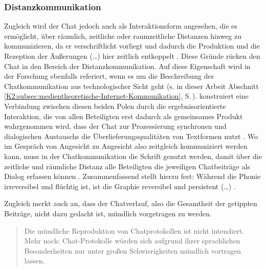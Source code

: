 \subsubsection{Distanzkommunikation}\label{K2:para:Distanzkommunikation}
Zugleich wird der Chat jedoch auch als Interaktionsform angesehen, die es ermöglicht, \glqq über räumlich, zeitliche oder raumzeitliche Distanzen hinweg\grqq{} \citep[12]{beck_computervermittelte_2006} zu kommunizieren, da er verschriftlicht vorliegt und dadurch \glqq die Produktion und die Rezeption der Äußerungen (\dots) hier zeitlich entkoppelt\grqq{} \citep[][35]{durscheid_personale_2018}. Diese Gründe rücken den Chat in den Bereich der Distanzkommunikation. Auf diese Eigenschaft wird in der Forschung ebenfalls referiert, wenn es um die Beschreibung der Chatkommunikation aus technologischer Sicht geht (s. in dieser Arbeit Abschnitt \ref{K2:subsec:medientheoretische-Internet-Kommunikation}, S.\,\pageref{K2:subsec:medientheoretische-Internet-Kommunikation}). \citeauthor{beiswenger_chattern_2010} konstruiert eine Verbindung zwischen diesen beiden Polen durch die ergebnisorientierte Interaktion, die von allen Beteiligten erst dadurch als gemeinsames Produkt wahrgenommen wird, dass der Chat \glqq zur Prozessierung synchronen und dialogischen Austauschs die Überlieferungsqualitäten von Textformen nutzt\grqq{} \citep[249]{beiswenger_chattern_2010}. Wo im Gespräch von Angesicht zu Angesicht also zeitgleich kommuniziert werden kann, muss in der Chatkommunikation die Schrift genutzt werden, damit über die zeitliche und räumliche Distanz alle Beteiligten die jeweiligen Chatbeiträge als Dialog erfassen können \citep[249]{beiswenger_chattern_2010}. Zusammenfassend stellt \citeauthor{beiswenger_chattern_2010} hierzu fest: \glqq Während die Phonie irreversibel und flüchtig ist, ist die Graphie reversibel und persistent (\dots)\grqq{} \citep[249]{beiswenger_chattern_2010}.

Zugleich merkt \citeauthor{storrer_sprachliche_2001} auch an, dass der Chatverlauf, also die Gesamtheit der getippten Beiträge, nicht dazu gedacht ist, mündlich vorgetragen zu werden.

\begin{quote}\sloppy
Die mündliche Reproduktion von Chatprotokollen ist nicht intendiert. Mehr noch: Chat-Protokolle würden sich aufgrund ihrer sprachlichen Besonderheiten nur unter großen Schwierigkeiten mündlich vortragen lassen. \citep[4]{storrer_sprachliche_2001}
\end{quote}

